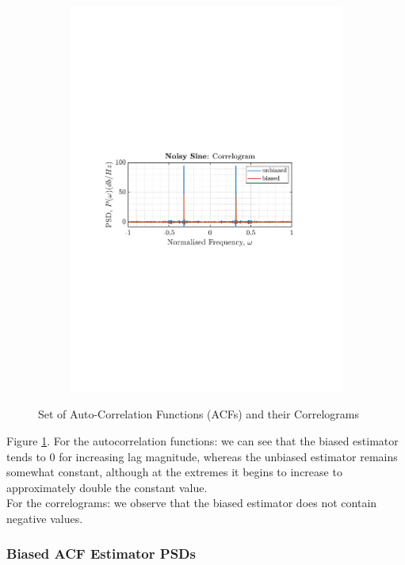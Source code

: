 \documentclass[12pt]{article}
\numberwithin{equation}{section}
\begin{document}
\begin{figure}[H]
\begin{subfigure}{0.49\textwidth}
			\includegraphics[trim={2.2cm 11.2cm 3.15cm  11.2cm}, clip, width=\textwidth]{../MATLAB/figures/q1_3a_fig03.pdf} 
		\end{subfigure}
		\captionsetup{justification=centering}
		\caption{Set of Auto-Correlation Functions (ACFs) and their Correlograms}
		\label{fig: 1-3a}
	\end{figure}
	
	Figure \ref{fig: 1-3a}. For the autocorrelation functions: we can see that the biased estimator tends to 0 for increasing lag magnitude, whereas the unbiased estimator remains somewhat constant, although at the extremes it begins to increase to approximately double the constant value.\\
	For the correlograms: we observe that the biased estimator does not contain negative values.
	
	\subsubsection{Biased ACF Estimator PSDs}
\end{document}
